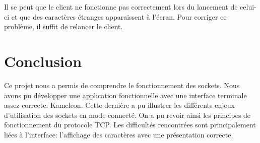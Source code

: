 \documentclass[11pt]{article}
\begin{document}
    Il se peut que le client ne fonctionne pas correctement lors du lancement de celui-ci et que des caractères étranges apparaissent à l'écran. Pour corriger ce problème, il suffit de relancer le client.    






\FloatBarrier

\section{Conclusion}
    
    Ce projet nous a permis de comprendre le fonctionnement des sockets. Nous avons pu développer une application fonctionnelle avec une interface terminale assez correcte: Kameleon. Cette dernière a pu illustrer les différents enjeux d'utilisation des sockets en mode connecté. On a pu revoir ainsi les principes de fonctionnement du protocole TCP. Les difficultés rencontrées sont principalement liées à l'interface: l'affichage des caractères avec une présentation correcte.      
    
\end{document}
